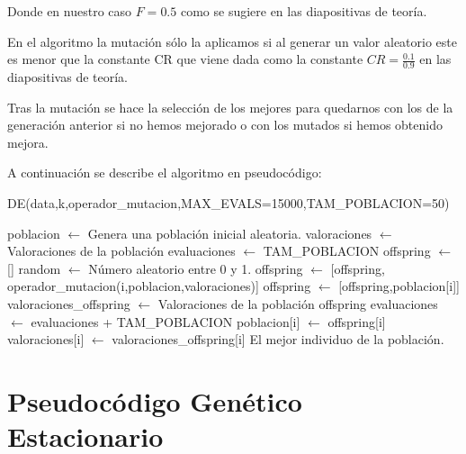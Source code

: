 \documentclass[12pt,a4paper]{article}
\begin{document}
	Donde en nuestro caso $F=0.5$ como se sugiere en las diapositivas de teoría.
	
	En el algoritmo la mutación sólo la aplicamos si al generar un valor aleatorio este es menor que la constante CR que viene dada como la constante $CR = \frac{0.1}{0.9}$ en las diapositivas de teoría.
	
	Tras la mutación se hace la selección de los mejores para quedarnos con los de la generación anterior si no hemos mejorado o con los mutados si hemos obtenido mejora.
	
	A continuación se describe el algoritmo en pseudocódigo:
	
	\begin{algorithm}
		\caption{DE(data,k,operador\_mutacion,MAX\_EVALS=15000,TAM\_POBLACION=50)}
		\begin{algorithmic}			
			\STATE poblacion $\leftarrow$ Genera una población inicial aleatoria.
			\STATE valoraciones $\leftarrow$ Valoraciones de la población
			\STATE 
			\STATE evaluaciones $\leftarrow$ TAM\_POBLACION
			\STATE 
				\STATE offspring $\leftarrow$ []
					\STATE random $\leftarrow$ Número aleatorio entre 0 y 1.
						\STATE offspring $\leftarrow$ [offspring, operador\_mutacion(i,poblacion,valoraciones)]
					\ELSE
						\STATE offspring $\leftarrow$ [offspring,poblacion[i]]
					\ENDIF
				\ENDFOR
				\STATE valoraciones\_offspring $\leftarrow$ Valoraciones de la población offspring
				\STATE evaluaciones $\leftarrow$ evaluaciones + TAM\_POBLACION
				\STATE 
						\STATE poblacion[i] $\leftarrow$ offspring[i]
						\STATE valoraciones[i] $\leftarrow$ valoraciones\_offspring[i]
					\ENDIF
				\ENDFOR
			\ENDWHILE
			\RETURN El mejor individuo de la población.
		\end{algorithmic}
	\end{algorithm}

	\section{Pseudocódigo Genético Estacionario}
	\label{sec:GE}
\end{document}
